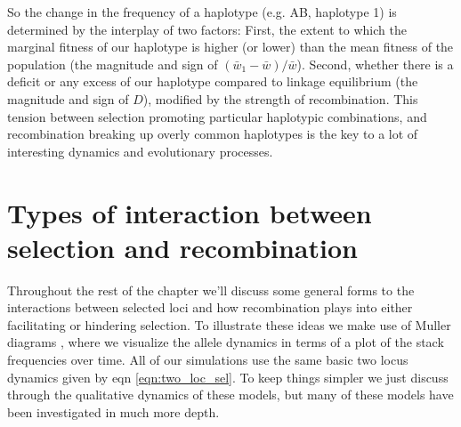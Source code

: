 So the change in the frequency of a haplotype (e.g. AB, haplotype 1) is determined by the interplay of two factors: First, the extent to which  the marginal fitness of our haplotype is higher (or lower) than the mean fitness of the population (the magnitude and sign of $(\bar{w}_1-\bar{w})/\bar{w}$). Second, whether there is a deficit or any excess of our haplotype compared to linkage equilibrium (the magnitude and sign of $D$), modified by the strength of recombination. This tension between selection promoting particular haplotypic combinations, and recombination breaking up overly common haplotypes is the key to a lot of interesting dynamics and evolutionary processes.

\section{Types of interaction between selection and recombination}
Throughout the rest of the chapter we'll discuss some general forms to the interactions between selected loci and how recombination plays into either facilitating or hindering selection. To illustrate these ideas we make use of Muller diagrams \citep{muller1932some}, where we visualize the allele dynamics in terms of a plot of the stack frequencies over time. All of our simulations use the same basic two locus dynamics given by eqn \eqref{eqn:two_loc_sel}. To keep things simpler we just discuss through the qualitative dynamics of these models, but many of these models have been investigated in much more depth.

